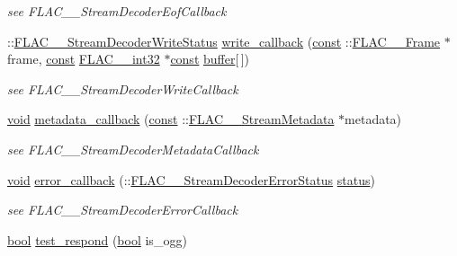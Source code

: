 \begin{DoxyCompactItemize}
\begin{DoxyCompactList}\small\item\em see F\+L\+A\+C\+\_\+\+\_\+\+Stream\+Decoder\+Eof\+Callback \end{DoxyCompactList}\item 
\+::\hyperlink{group__flac__stream__decoder_ga73f67eb9e0ab57945afe038751bc62c8}{F\+L\+A\+C\+\_\+\+\_\+\+Stream\+Decoder\+Write\+Status} \hyperlink{class_stream_decoder_a797fa5f97b62f5e51a6f867239ff9100}{write\+\_\+callback} (\hyperlink{getopt1_8c_a2c212835823e3c54a8ab6d95c652660e}{const} \+::\hyperlink{struct_f_l_a_c_____frame}{F\+L\+A\+C\+\_\+\+\_\+\+Frame} $\ast$frame, \hyperlink{getopt1_8c_a2c212835823e3c54a8ab6d95c652660e}{const} \hyperlink{ordinals_8h_a33fd77bfe6d685541a0c034a75deccdc}{F\+L\+A\+C\+\_\+\+\_\+int32} $\ast$\hyperlink{getopt1_8c_a2c212835823e3c54a8ab6d95c652660e}{const} \hyperlink{structbuffer}{buffer}\mbox{[}$\,$\mbox{]})
\begin{DoxyCompactList}\small\item\em see F\+L\+A\+C\+\_\+\+\_\+\+Stream\+Decoder\+Write\+Callback \end{DoxyCompactList}\item 
\hyperlink{sound_8c_ae35f5844602719cf66324f4de2a658b3}{void} \hyperlink{class_stream_decoder_a565eb0d5957ef4921406a7a6263e1d84}{metadata\+\_\+callback} (\hyperlink{getopt1_8c_a2c212835823e3c54a8ab6d95c652660e}{const} \+::\hyperlink{struct_f_l_a_c_____stream_metadata}{F\+L\+A\+C\+\_\+\+\_\+\+Stream\+Metadata} $\ast$metadata)
\begin{DoxyCompactList}\small\item\em see F\+L\+A\+C\+\_\+\+\_\+\+Stream\+Decoder\+Metadata\+Callback \end{DoxyCompactList}\item 
\hyperlink{sound_8c_ae35f5844602719cf66324f4de2a658b3}{void} \hyperlink{class_stream_decoder_a777297f11f2cd45b922f06b06e1ce320}{error\+\_\+callback} (\+::\hyperlink{group__flac__stream__decoder_ga130e70bd9a73d3c2416247a3e5132ecf}{F\+L\+A\+C\+\_\+\+\_\+\+Stream\+Decoder\+Error\+Status} \hyperlink{rfft2d_test_m_l_8m_a1b5437a866e6f95107b07ba845bc1800}{status})
\begin{DoxyCompactList}\small\item\em see F\+L\+A\+C\+\_\+\+\_\+\+Stream\+Decoder\+Error\+Callback \end{DoxyCompactList}\item 
\hyperlink{mac_2config_2i386_2lib-src_2libsoxr_2soxr-config_8h_abb452686968e48b67397da5f97445f5b}{bool} \hyperlink{class_stream_decoder_a9999cc43a682b708b627e40e7ff530e5}{test\+\_\+respond} (\hyperlink{mac_2config_2i386_2lib-src_2libsoxr_2soxr-config_8h_abb452686968e48b67397da5f97445f5b}{bool} is\+\_\+ogg)
\end{DoxyCompactItemize}
